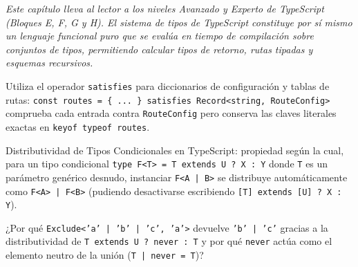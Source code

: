 \documentclass{book}
\begin{document}
\noindent\textit{Este capítulo lleva al lector a los niveles Avanzado y Experto de TypeScript (Bloques E, F, G y H). El sistema de tipos de TypeScript constituye por sí mismo un lenguaje funcional puro que se evalúa en tiempo de compilación sobre conjuntos de tipos, permitiendo calcular tipos de retorno, rutas tipadas y esquemas recursivos.}

\begin{tcolorbox}[title={Consejo}, studiumtip, breakable]

Utiliza el operador \texttt{satisfies} para diccionarios de configuración y tablas de rutas: \texttt{const routes = \{ ... \} satisfies Record<string, RouteConfig>} comprueba cada entrada contra \texttt{RouteConfig} pero conserva las claves literales exactas en \texttt{keyof typeof routes}.
\end{tcolorbox}

\begin{tcolorbox}[title={Definición}, studiumdef, breakable]

Distributividad de Tipos Condicionales en TypeScript: propiedad según la cual, para un tipo condicional \texttt{type F<T> = T extends U ? X : Y} donde \texttt{T} es un parámetro genérico desnudo, instanciar \texttt{F<A | B>} se distribuye automáticamente como \texttt{F<A> | F<B>} (pudiendo desactivarse escribiendo \texttt{[T] extends [U] ? X : Y}).
\end{tcolorbox}

\begin{tcolorbox}[title={Autoficha}, studiumcheck, breakable]

¿Por qué \texttt{Exclude<'a' | 'b' | 'c', 'a'>} devuelve \texttt{'b' | 'c'} gracias a la distributividad de \texttt{T extends U ? never : T} y por qué \texttt{never} actúa como el elemento neutro de la unión (\texttt{T | never = T})?
\end{tcolorbox}
\end{document}

